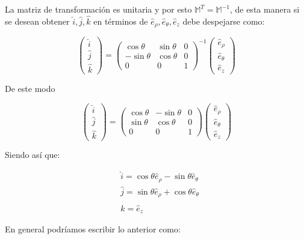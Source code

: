 La matriz de transformación es unitaria y por esto $\mathbb{M}^{T}=\mathbb{M}^{-1}$, de esta manera si se desean obtener $\hat{i}, \hat{j}, \hat{k}$ en términos de $\hat{e}_{\rho}, \widehat{e}_{\theta}, \hat{e}_{z}$ debe despejarse como:

$$
\left(\begin{array}{c}
\hat{i} \\
\hat{j} \\
\hat{k}
\end{array}\right)=\left(\begin{array}{ccc}
\cos \theta & \sin \theta & 0 \\
-\sin \theta & \cos \theta & 0 \\
0 & 0 & 1
\end{array}\right)^{-1}\left(\begin{array}{l}
\hat{e}_{\rho} \\
\hat{e}_{\theta} \\
\hat{e}_{z}
\end{array}\right)
$$

De este modo

$$
\left(\begin{array}{l}
\hat{i} \\
\hat{j} \\
\hat{k}
\end{array}\right)=\left(\begin{array}{ccc}
\cos \theta & -\sin \theta & 0 \\
\sin \theta & \cos \theta & 0 \\
0 & 0 & 1
\end{array}\right)\left(\begin{array}{l}
\hat{e}_{\rho} \\
\hat{e}_{\theta} \\
\hat{e}_{z}
\end{array}\right)
$$

Siendo así que:

$$
\begin{aligned}
& \hat{i}=\cos \theta \widehat{e}_{\rho}-\sin \theta \widehat{e}_{\theta} \\
& \hat{j}=\sin \theta \widehat{e}_{\rho}+\cos \theta \widehat{e}_{\theta} \\
& \hat{k}=\hat{e}_{z}
\end{aligned}
$$

En general podríamos escribir lo anterior como:

